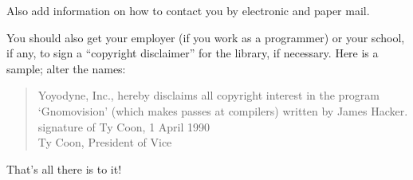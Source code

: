 \documentclass[11pt, letterpaper]{book}
\begin{document}
Also add information on how to contact you by electronic and paper mail.

You should also get your employer (if you work as a programmer) or your
school, if any, to sign a ``copyright disclaimer'' for the library, if
necessary. Here is a sample; alter the names:

\begin{quote}
Yoyodyne, Inc., hereby disclaims all copyright interest in the program \\
`Gnomovision' (which makes passes at compilers) written by James Hacker. \\

signature of Ty Coon, 1 April 1990 \\
Ty Coon, President of Vice
\end{quote}

That's all there is to it!

\end{document}
